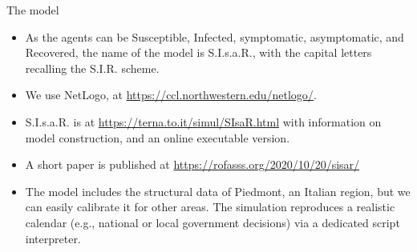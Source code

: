 \documentclass[9pt]{beamer}
\begin{document}
\begin{frame}{The model}

\begin{itemize}
 
 \item
As the agents can be Susceptible, Infected, symptomatic, asymptomatic, and Recovered, the name of the model is S.I.s.a.R., with the capital letters recalling the S.I.R. scheme.

\item 
We use NetLogo, at \url{https://ccl.northwestern.edu/netlogo/}.

\item
S.I.s.a.R. is at \url{https://terna.to.it/simul/SIsaR.html} with information on model construction, and an online executable version.

\item
 A short paper is published at \url{https://rofasss.org/2020/10/20/sisar/}

\item 
The model includes the structural data of Piedmont, an Italian region, but we can easily calibrate it for other areas. The simulation reproduces a realistic calendar (e.g., national or local government decisions) via a dedicated script interpreter.

\end{itemize}
\end{frame}
\end{document}
